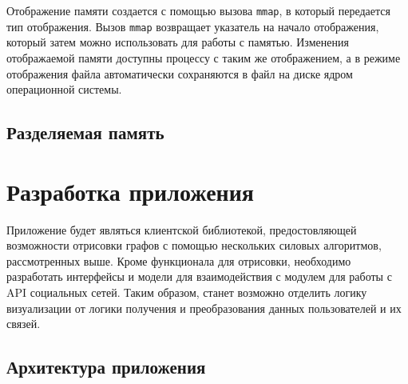 \documentclass[14pt, russian]{scrartcl}
\begin{document}
Отображение памяти создается с помощью вызова \verb|mmap|, в который передается
тип отображения. Вызов \verb|mmap| возвращает указатель на начало отображения,
который затем можно использовать для работы с памятью. Изменения отображаемой
памяти доступны процессу с таким же отображением, а в режиме отображения файла
автоматически сохраняются в файл на диске ядром операционной системы.

\subsection{Разделяемая память}



\section{Разработка приложения}

Приложение будет являться клиентской библиотекой, предостовляющей возможности
отрисовки графов с помощью нескольких силовых алгоритмов, рассмотренных выше.
Кроме функционала для отрисовки, необходимо разработать интерфейсы и модели для
взаимодействия с модулем для работы с API социальных сетей. Таким образом,
станет возможно отделить логику визуализации от логики получения и
преобразования данных пользователей и их связей.

\subsection{Архитектура приложения}
\end{document}
